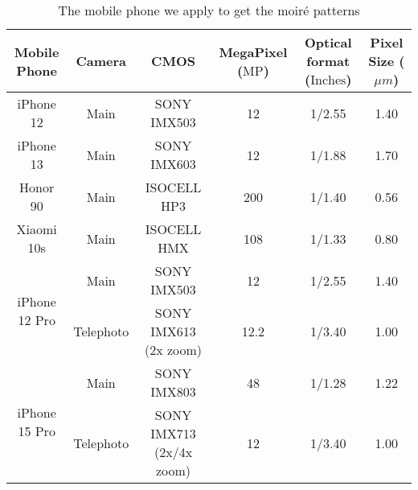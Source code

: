 \begin{table*}[t]

\centering
\vspace{-8pt}
\scalebox{0.95}
{      %
\begin{tabular}{c|ccccc}
\toprule[1.25pt]    %
Mobile Phone & Camera & CMOS & MegaPixel ($\text{MP}$) & Optical format ($\text{Inches}$) & Pixel Size ($\mu m$)   \\
\midrule
\multirow{1}{*}{iPhone 12}     & Main      & SONY   IMX503            & 12   & 1/2.55 & 1.40  \\
\multirow{1}{*}{iPhone 13}     & Main      & SONY IMX603              & 12   & 1/1.88 & 1.70  \\
\multirow{1}{*}{Honor 90}      & Main      & ISOCELL HP3              & 200  & 1/1.40 & 0.56  \\
\multirow{1}{*}{Xiaomi 10s}    & Main      & ISOCELL HMX              & 108  & 1/1.33 & 0.80  \\
\midrule
\multirow{2}{*}{iPhone 12 Pro} & Main      & SONY IMX503              & 12   & 1/2.55 & 1.40  \\
                               & Telephoto & SONY IMX613 (2x zoom)    & 12.2 & 1/3.40 & 1.00  \\
\midrule
\multirow{2}{*}{iPhone 15 Pro} & Main      & SONY IMX803              & 48   & 1/1.28 & 1.22  \\
                               & Telephoto & SONY IMX713 (2x/4x zoom) & 12   & 1/3.40 & 1.00  \\


\bottomrule[1.25pt]  %
\end{tabular}
}
\caption{The mobile phone we apply to get the moiré patterns}
\label{tab:Datasets-Phone}
\end{table*}



